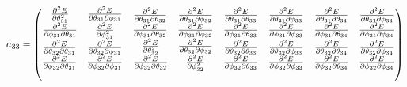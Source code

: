 \documentclass[9pt]{article}
\begin{document}
\begin{equation*}
	a_{33} = 
	\begin{pmatrix}
		\begin{matrix} 
			\pdv[2]{E}{\theta_{31}} & \pdv{E}{\theta_{31}}{\phi_{31}} \\
			\pdv{E}{\phi_{31}}{\theta_{31}} & \pdv[2]{E}{\phi_{31}}
		\end{matrix}& 	
		\begin{matrix} 
			\pdv{E}{\theta_{31}}{\theta_{32}} & \pdv{E}{\theta_{31}}{\phi_{32}} \\
			\pdv{E}{\phi_{31}}{\theta_{32}} & \pdv{E}{\phi_{31}}{\phi_{32}} 
		\end{matrix}& 
		\begin{matrix} 
			\pdv{E}{\theta_{31}}{\theta_{33}} & \pdv{E}{\theta_{31}}{\phi_{33}} \\
			\pdv{E}{\phi_{31}}{\theta_{33}} & \pdv{E}{\phi_{31}}{\phi_{33}} 
		\end{matrix}&
		\begin{matrix} 
			\pdv{E}{\theta_{31}}{\theta_{34}} & \pdv{E}{\theta_{31}}{\phi_{34}} \\
			\pdv{E}{\phi_{31}}{\theta_{34}} & \pdv{E}{\phi_{31}}{\phi_{34}} 
		\end{matrix}\\
		\begin{matrix} 
			\pdv{E}{\theta_{32}}{\theta_{31}} & \pdv{E}{\theta_{32}}{\phi_{31}} \\
			\pdv{E}{\phi_{32}}{\theta_{31}} & \pdv{E}{\phi_{32}}{\phi_{31}} 
		\end{matrix} & 
		\begin{matrix} 
			\pdv[2]{E}{\theta_{32}} & \pdv{E}{\theta_{32}}{\phi_{32}} \\
			\pdv{E}{\phi_{32}}{\theta_{32}} & \pdv[2]{E}{\phi_{32}} 
		\end{matrix}&
		\begin{matrix} 
			\pdv{E}{\theta_{32}}{\theta_{33}} & \pdv{E}{\theta_{32}}{\phi_{33}} \\
			\pdv{E}{\phi_{32}}{\theta_{33}} & \pdv{E}{\phi_{32}}{\phi_{33}} 
		\end{matrix}&
		\begin{matrix} 
			\pdv{E}{\theta_{32}}{\theta_{34}} & \pdv{E}{\theta_{32}}{\phi_{34}} \\
			\pdv{E}{\phi_{32}}{\theta_{34}} & \pdv{E}{\phi_{32}}{\phi_{34}} 
		\end{matrix}\\
		\begin{matrix} 

\end{matrix}
\end{pmatrix}
\end{equation*}
\end{document}
